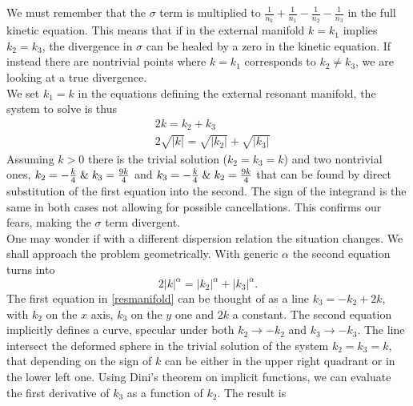     We must remember that the $\sigma$ term is multiplied to $\frac{1}{n_k} + \frac{1}{n_1} -\frac{1}{n_2} -\frac{1}{n_3}$ in the full kinetic equation. This means that if in the external manifold $k = k_1$ implies $k_2 = k_3$, the divergence in $\sigma$ can be healed by a zero in the kinetic equation. If instead there are nontrivial points where $k=k_1$ corresponds to $k_2 \neq k_3$, we are looking at a true divergence.\\
    We set $k_1=k$ in the equations defining the external resonant manifold, the system to solve is thus
    \begin{equation}
        \begin{aligned}
            &2k = k_2 + k_3 \\
            &2\sqrt{|k|} = \sqrt{|k_2|} + \sqrt{|k_3|}
        \end{aligned}
        \label{resmanifold}
    \end{equation}
    Assuming $k>0$ there is the trivial solution ($k_2 = k_3 = k$) and two nontrivial ones,
    $k_2 = -\frac{k}{4} \hspace{1mm} \& \hspace{1mm}k_3 = \frac{9k}{4} $ and $k_3 = -\frac{k}{4} \hspace{1mm}\& \hspace{1mm}k_2 = \frac{9k}{4} $ that can be found by direct substitution of the first equation into the second. The sign of the integrand is the same in both cases not allowing for possible cancellations.  This confirms our fears, making the $\sigma$ term divergent.\\
    One may wonder if with a different dispersion relation the situation changes. We shall approach the problem geometrically.
    With generic $\alpha$ the second equation turns into 
    \begin{equation}
      2|k|^{\alpha} = |k_2|^{\alpha} +|k_3|^{\alpha}.
      \label{frequency}
    \end{equation} 
    The first equation in \eqref{resmanifold} can be thought of as a line $k_3 = -k_2 + 2k$, with $k_2$ on the $x$ axis, $k_3$ on the $y$ one and $2k$ a constant. The second equation implicitly defines  a curve, specular under both $k_2 \rightarrow -k_2$ and $k_3 \rightarrow -k_3$. The line intersect the deformed sphere in the trivial solution of the system $k_2 = k_3 = k$, that depending on the sign of $k$ can be either in the upper right quadrant or in the lower left one. Using Dini's theorem on implicit functions, we can evaluate the first derivative of $k_3$ as a function of $k_2$. The result is 
